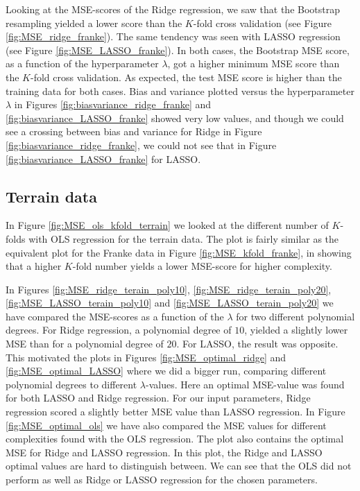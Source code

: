 \documentclass[norsk,a4paper,12pt]{article}
\begin{document}
\begin{multicols}{2}
Looking at the MSE-scores of the Ridge regression, we saw that the Bootstrap resampling yielded a lower score than the $K$-fold cross validation (see Figure \ref{fig:MSE_ridge_franke}). The same tendency was seen with LASSO regression (see Figure \ref{fig:MSE_LASSO_franke}). In both cases, the Bootstrap MSE score, as a function of the hyperparameter $\lambda$, got a higher minimum MSE score than the $K$-fold cross  validation. As expected, the test MSE score is higher than the training data for both cases. Bias and variance plotted versus the hyperparameter $\lambda$ in Figures \ref{fig:biasvariance_ridge_franke} and \ref{fig:biasvariance_LASSO_franke}  showed very low values, and though we could see a crossing between bias and variance for Ridge in Figure \ref{fig:biasvariance_ridge_franke}, we could not see that in Figure \ref{fig:biasvariance_LASSO_franke} for LASSO.

\subsection{Terrain data}

In Figure \ref{fig:MSE_ols_kfold_terrain} we looked at the different number of $K$-folds with OLS regression for the terrain data. The plot is fairly similar as the equivalent plot for the Franke data in Figure \ref{fig:MSE_kfold_franke}, in showing that a higher $K$-fold number yields a lower MSE-score for higher complexity.

In Figures \ref{fig:MSE_ridge_terain_poly10}, \ref{fig:MSE_ridge_terain_poly20}, \ref{fig:MSE_LASSO_terain_poly10} and \ref{fig:MSE_LASSO_terain_poly20} we have compared the MSE-scores as a function of the $\lambda$ for two different polynomial degrees. For Ridge regression, a polynomial degree of $10$, yielded a slightly lower MSE than for a polynomial degree of $20$. For LASSO, the result was opposite. This motivated the plots in Figures \ref{fig:MSE_optimal_ridge} and \ref{fig:MSE_optimal_LASSO} where we did a bigger run, comparing different polynomial degrees to different $\lambda$-values. Here an optimal MSE-value was found for both LASSO and Ridge regression. For our input parameters, Ridge regression scored a slightly better MSE value than LASSO regression. In Figure \ref{fig:MSE_optimal_ols} we have also compared the MSE values for different complexities found with the OLS regression. The plot also contains the optimal MSE for Ridge and LASSO regression. In this plot, the Ridge and LASSO optimal values are hard to distinguish between. We can see that the OLS did not perform as well as Ridge or LASSO regression for the chosen parameters.


\end{multicols}
\end{document}
